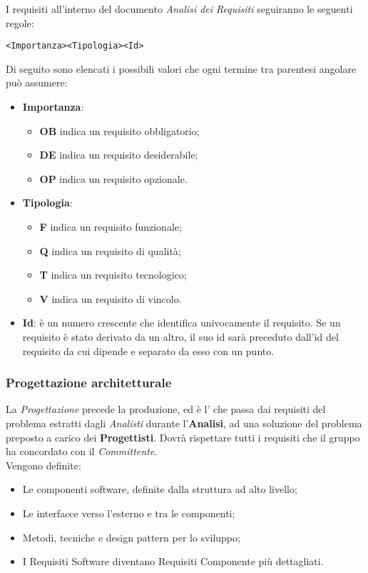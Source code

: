 \documentclass{scalatekids-article}
\begin{document}
\label{sec:adr}
I requisiti all'interno del documento \textit{Analisi dei Requisiti} seguiranno le seguenti regole:
\begin{center}
    \verb=<Importanza><Tipologia><Id>=
\end{center}
Di seguito sono elencati i possibili valori che ogni termine tra parentesi angolare può assumere:
\begin{itemize}
    \item \textbf{Importanza}:
        \begin{itemize}
            \item \textbf{OB} indica un requisito obbligatorio;
            \item \textbf{DE} indica un requisito desiderabile;
            \item \textbf{OP} indica un requisito opzionale.
        \end{itemize}
    \item \textbf{Tipologia}:
        \begin{itemize}
            \item \textbf{F} indica un requisito funzionale;
            \item \textbf{Q} indica un requisito di qualità;
            \item \textbf{T} indica un requisito tecnologico;
            \item \textbf{V} indica un requisito di vincolo.
        \end{itemize}
    \item \textbf{Id}: è un numero crescente che identifica univocamente il requisito. Se un requisito è stato derivato da un altro, il suo id sarà preceduto dall'id del requisito da cui dipende e separato da esso con un punto.
\end{itemize}

\subsubsection{Progettazione architetturale}

La \textit{Progettazione} precede la produzione, ed è l' che
passa dai requisiti del problema estratti dagli \textit{Analisti} durante
l'\textbf{Analisi}, ad una soluzione del problema preposto a carico dei
\textbf{Progettisti}. Dovrà rispettare tutti i requisiti che il gruppo ha
concordato con il \textit{Committente}.\\
Vengono definite:
\begin{itemize}
    \item Le componenti software, definite dalla struttura ad alto livello;
    \item Le interfacce verso l'esterno e tra le componenti;
    \item Metodi, tecniche e design pattern per lo sviluppo;
    \item I Requisiti Software diventano Requisiti Componente più
        dettagliati.
\end{itemize}
\end{document}
